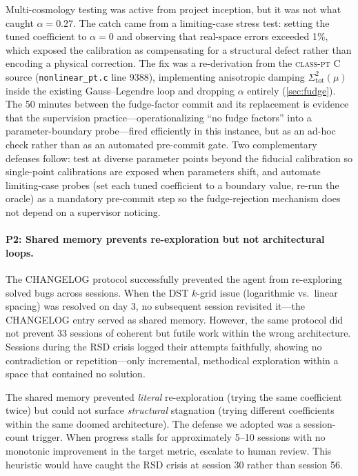 \documentclass{article}
\newcommand{\classpt}{\textsc{class-pt}\xspace}
\begin{document}
Multi-cosmology testing was active from project inception, but it was not what caught $\alpha=0.27$. The catch came from a limiting-case stress test: setting the tuned coefficient to $\alpha=0$ and observing that real-space errors exceeded 1\%, which exposed the calibration as compensating for a structural defect rather than encoding a physical correction. The fix was a re-derivation from the \classpt C source (\texttt{nonlinear\_pt.c} line 9388), implementing anisotropic damping $\Sigma^2_\mathrm{tot}(\mu)$ inside the existing Gauss--Legendre loop and dropping $\alpha$ entirely (\cref{sec:fudge}). The 50 minutes between the fudge-factor commit and its replacement is evidence that the supervision practice---operationalizing ``no fudge factors'' into a parameter-boundary probe---fired efficiently in this instance, but as an ad-hoc check rather than as an automated pre-commit gate. Two complementary defenses follow: test at diverse parameter points beyond the fiducial calibration so single-point calibrations are exposed when parameters shift, and automate limiting-case probes (set each tuned coefficient to a boundary value, re-run the oracle) as a mandatory pre-commit step so the fudge-rejection mechanism does not depend on a supervisor noticing.

\paragraph{P2: Shared memory prevents re-exploration but not architectural loops.}

The CHANGELOG protocol successfully prevented the agent from re-exploring solved bugs across sessions. When the DST $k$-grid issue (logarithmic vs.\ linear spacing) was resolved on day 3, no subsequent session revisited it---the CHANGELOG entry served as shared memory. However, the same protocol did not prevent 33 sessions of coherent but futile work within the wrong architecture. Sessions during the RSD crisis logged their attempts faithfully, showing no contradiction or repetition---only incremental, methodical exploration within a space that contained no solution.

The shared memory prevented \emph{literal} re-exploration (trying the same coefficient twice) but could not surface \emph{structural} stagnation (trying different coefficients within the same doomed architecture). The defense we adopted was a session-count trigger. When progress stalls for approximately 5--10 sessions with no monotonic improvement in the target metric, escalate to human review. This heuristic would have caught the RSD crisis at session 30 rather than session 56.
\end{document}
